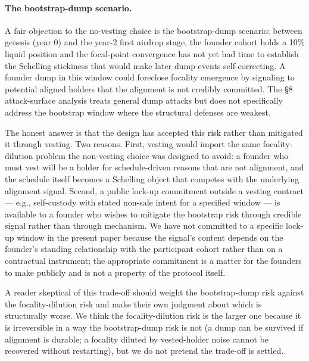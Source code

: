 \documentclass[11pt,a4paper]{article}
\theoremstyle{definition}
\theoremstyle{remark}
\begin{document}
\paragraph{The bootstrap-dump scenario.}
A fair objection to the no-vesting choice is the bootstrap-dump
scenario: between genesis (year 0) and the year-2 first airdrop
stage, the founder cohort holds a 10\% liquid position and the
focal-point convergence has not yet had time to establish the
Schelling stickiness that would make later dump events
self-correcting. A founder dump in this window could foreclose
focality emergence by signaling to potential aligned holders
that the alignment is not credibly committed. The §8 attack-surface
analysis treats general dump attacks but does not specifically
address the bootstrap window where the structural defenses are
weakest.

The honest answer is that the design has accepted this risk
rather than mitigated it through vesting. Two reasons. First,
vesting would import the same focality-dilution problem the
non-vesting choice was designed to avoid: a founder who must
vest will be a holder for schedule-driven reasons that are not
alignment, and the schedule itself becomes a Schelling object
that competes with the underlying alignment signal. Second, a
public lock-up commitment outside a vesting contract --- e.g.,
self-custody with stated non-sale intent for a specified
window --- is available to a founder who wishes to mitigate the
bootstrap risk through credible signal rather than through
mechanism. We have not committed to a specific lock-up window
in the present paper because the signal's content depends on
the founder's standing relationship with the participant
cohort rather than on a contractual instrument; the
appropriate commitment is a matter for the founders to make
publicly and is not a property of the protocol itself.

A reader skeptical of this trade-off should weight the
bootstrap-dump risk against the focality-dilution risk and
make their own judgment about which is structurally worse. We
think the focality-dilution risk is the larger one because it
is irreversible in a way the bootstrap-dump risk is not (a
dump can be survived if alignment is durable; a focality
diluted by vested-holder noise cannot be recovered without
restarting), but we do not pretend the trade-off is settled.
\end{document}
